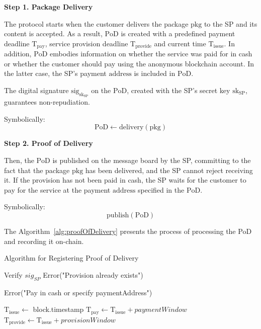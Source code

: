 \documentclass[pdftex,twocolumn,epjc3]{svjour3}
\begin{document}
{\noindent \textbf
{Step 1. Package Delivery}\label{step-1-package-delivery}

The protocol starts when the customer delivers the package $\mathrm{pkg}$ to the SP and its content is accepted. As a result, $\mathrm{PoD}$ is created with a predefined payment deadline $\mathrm{T}_\mathrm{pay}$, service provision deadline $\mathrm{T}_\mathrm{provide}$ and current time $\mathrm{T}_\mathrm{issue}$. In addition, $\mathrm{PoD}$ embodies information on whether the service was paid for in cash or whether the customer should pay using the anonymous blockchain account. In the latter case, the SP's payment $\mathrm{address}$ is included in $\mathrm{PoD}$.

The digital signature $\mathrm{sig}_{\mathrm{sk}_\mathrm{SP}}$ on the $\mathrm{PoD}$, created with the SP's secret key $\mathrm{sk}_\mathrm{SP}$, guarantees non-repudiation.

Symbolically: 
\[
\mathrm{PoD \gets delivery(pkg)}
\]

\noindent \textbf
{Step 2. Proof of Delivery}\label{step-2-pod}

Then, the $\mathrm{PoD}$ is published on the message board by the SP, committing to the fact that the package $\mathrm{pkg}$ has been delivered, and the SP cannot reject receiving it. If the provision has not been paid in cash, the SP waits for the customer to pay for the service at the payment $\mathrm{address}$ specified in the $\mathrm{PoD}$.

Symbolically: 
\[
\mathrm{publish(PoD)}
\]

The Algorithm~\ref{alg:proofOfDelivery} presents the process of processing the PoD and recording it on-chain.

\begin{algorithm}
\caption{Algorithm for Registering Proof of Delivery}
\label{alg:proofOfDelivery}
\begin{algorithmic}[1]
    \State Verify $sig_{SP}$
        \State \Return Error("Provision already exists")
    \EndIf

        \State \Return Error("Pay in cash or specify paymentAddress")
    \EndIf
    
    \State $\mathrm{T}_\mathrm{issue} \gets$ block.timestamp
    \State $\mathrm{T}_\mathrm{pay} \gets \mathrm{T}_\mathrm{issue} + paymentWindow$
    \State $\mathrm{T}_\mathrm{provide} \gets \mathrm{T}_\mathrm{issue} + provisionWindow$


\end{algorithmic}
\end{algorithm}}
\end{document}
